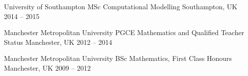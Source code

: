 

\begin{cventries}

  \cventry
    {University of Southampton} %
    {MSc Computational Modelling} %
    {Southampton, UK} %
    {2014 -- 2015} %
    {}

  \cventry
    {Manchester Metropolitan University} %
    {PGCE Mathematics and Qualified Teacher Status} %
    {Manchester, UK} %
    {2012 -- 2014} %
    {}

  \cventry
    {Manchester Metropolitan University} %
    {BSc Mathematics, First Class Honours} %
    {Manchester, UK} %
    {2009 -- 2012} %
    {}

\end{cventries}
